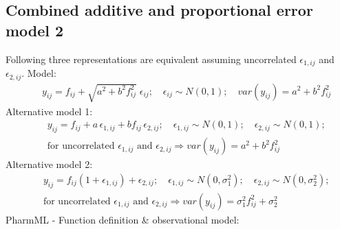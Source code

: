 \documentclass[a4paper,10pt]{article}
\begin{document}
\subsection{Combined additive and proportional error model 2}
Following three representations are equivalent assuming uncorrelated $\epsilon_{1,ij}$ and $\epsilon_{2,ij}$.
\label{model4}
Model:
\begin{eqnarray}
&& y_{ij} =  f_{ij} + \sqrt{a^2 + b^2f_{ij}^2} \; \epsilon_{ij}; \quad \epsilon_{ij} \sim N(0,1); \quad \mathit{var}(y_{ij}) = a^2 + b^2f_{ij}^2 \nonumber
\end{eqnarray}
Alternative model 1:
\begin{eqnarray}
&& y_{ij} =  f_{ij} +  a\, \epsilon_{1,ij} + b f_{ij}\, \epsilon_{2,ij}; \quad \epsilon_{1,ij} \sim N(0,1); \quad \epsilon_{2,ij} \sim N(0,1);  \nonumber \\
&& \text{for uncorrelated $\epsilon_{1,ij}$ and $\epsilon_{2,ij}$} \Rightarrow  \mathit{var}(y_{ij}) = a^2 + b^2f_{ij}^2 \nonumber
\end{eqnarray}
Alternative model 2:
\begin{eqnarray}
&& y_{ij} =  f_{ij} (1 + \epsilon_{1,ij}) + \epsilon_{2,ij}; \quad \epsilon_{1,ij} \sim N(0,\sigma_1^2); \quad \epsilon_{2,ij} \sim N(0,\sigma_2^2);  \nonumber \\
&& \text{for uncorrelated $\epsilon_{1,ij}$ and $\epsilon_{2,ij}$} \Rightarrow \mathit{var}(y_{ij}) = \sigma_1^2 f_{ij}^2 + \sigma_2^2 \nonumber
\end{eqnarray}
PharmML - Function definition \& observational model:
\end{document}
